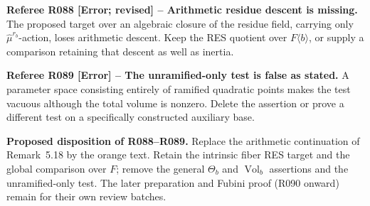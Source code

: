 \documentclass[12pt]{amsart}
\theoremstyle{remark}
\theoremstyle{definition}
\numberwithin{equation}{section}
\newcommand{\Vol}{\operatorname{Vol}}
\theoremstyle{plain}
\begin{document}
\medskip
{\normalfont\small\color{RefereePurple}
\noindent\textbf{Referee R088 [Error; revised] --
Arithmetic residue descent is missing.}
The proposed target over an algebraic closure of the residue
field, carrying only $\widehat\mu^{r_b}$-action, loses
arithmetic descent. Keep the RES quotient over
$F\langle b\rangle$, or supply a comparison retaining that
descent as well as inertia.\par
\medskip
\noindent\textbf{Referee R089 [Error] --
The unramified-only test is false as stated.}
A parameter space consisting entirely of ramified quadratic
points makes the test vacuous although the total volume is
nonzero. Delete the assertion or prove a different test on a
specifically constructed auxiliary base.\par}
\medskip
{\normalfont\small\color{ProposalOrange}
\noindent\textbf{Proposed disposition of R088--R089.}
Replace the arithmetic continuation of Remark~5.18 by the
orange text. Retain the intrinsic fiber RES target and the
global comparison over $F$; remove the general
$\Theta_b$ and $\Vol_b$ assertions and the unramified-only
test. The later preparation and Fubini proof (R090 onward)
remain for their own review batches.}
\end{document}

